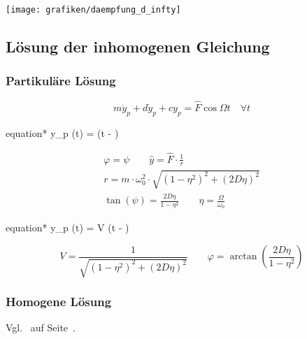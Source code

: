 \documentclass[9pt,fleqn,ngerman,article]{memoir}
\begin{document}
\begin{multicols*}{3}
						\begin{center}
							\texttt{[image: grafiken/daempfung\_d\_infty]}
						\end{center}
				
			
			\subsection{Lösung der inhomogenen Gleichung} %
				
				\subsubsection{Partikuläre Lösung} %
					
					\[
						m \ddot{y}_p + d \dot{y}_p + c y_p = \hat{F} \cos \Omega t \quad \forall t
					\]
					
					\begin{empheq}[box=\shadowbox*]{equation*}
						y_p (t) =  \cos (\Omega t - \varphi)
					\end{empheq}
					
					\begin{gather*}
						\varphi = \psi \qquad \hat{y} = \hat{F} \cdot \frac{1}{r} \\
						r = m \cdot \omega_0^2 \cdot \sqrt{(1-\eta^2)^2 + (2D \eta)^2} \\
						\tan(\psi) = \frac{2D\eta}{1-\eta^2} \qquad \eta = \frac{\Omega}{\omega_0}
					\end{gather*}
					
					\begin{empheq}[box=\shadowbox*]{equation*}
						y_p (t) =  V \cos (\Omega t - \varphi)
					\end{empheq}
					
					\[
						V = \frac{1}{\sqrt{(1- \eta^2)^2 + (2D \eta)^2}} \qquad \varphi = \arctan \left(\frac{2D\eta}{1-\eta^2}\right)
					\]
				
				\subsubsection{Homogene Lösung} %
				
					Vgl.~ auf Seite~\pageref{subsec:daempfung}.
					

\end{multicols*}
\end{document}
